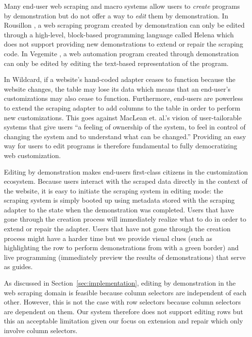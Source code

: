 \documentclass[sigconf,10pt]{acmart}
\begin{document}
Many end-user web scraping and macro systems allow users to
\emph{create} programs by demonstration but do not offer a way to
\emph{edit} them by demonstration. In Rousillon \citep{chasins2018}, a
web scraping program created by demonstration can only be edited through
a high-level, block-based programming language called Helena
\citep{zotero-51} which does not support providing new demonstrations to
extend or repair the scraping code. In Vegemite \citep{lin2009}, a web
automation program created through demonstration can only be edited by
editing the text-based representation of the program.

In Wildcard, if a website's hand-coded adapter ceases to function
because the website changes, the table may lose its data which means
that an end-user's customizations may also cease to function.
Furthermore, end-users are powerless to extend the scraping adapter to
add columns to the table in order to perform new customizations. This
goes against MacLean et. al.'s vision of user-tailorable systems
\citep{maclean1990} that give users ``a feeling of ownership of the
system, to feel in control of changing the system and to understand what
can be changed.'' Providing an easy way for users to edit programs is
therefore fundamental to fully democratizing web customization.

Editing by demonstration makes end-users first-class citizens in the
customization ecosystem. Because users interact with the scraped data
directly in the context of the website, it is easy to initiate the
scraping system in editing mode: the scraping system is simply booted up
using metadata stored with the scraping adapter to the state when the
demonstration was completed. Users that have gone through the creation
process will immediately realize what to do in order to extend or repair
the adapter. Users that have not gone through the creation process might
have a harder time but we provide visual clues (such as highlighting the
row to perform demonstrations from with a green border) and live
programming (immediately preview the results of demonstrations) that
serve as guides.

As discussed in Section~\ref{sec:implementation}, editing by
demonstration in the web scraping domain is feasible because column
selectors are independent of each other. However, this is not the case
with row selectors because column selectors are dependent on them. Our
system therefore does not support editing rows but this an acceptable
limitation given our focus on extension and repair which only involve
column selectors.
\end{document}
